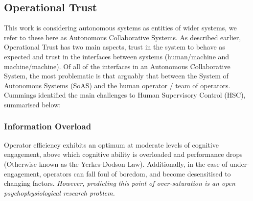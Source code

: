 
\subsection{Operational Trust}

This work is considering autonomous systems as entities of wider systems, we refer to these here as Autonomous Collaborative Systems. As described earlier, Operational Trust has two main aspects, trust in the system to behave as expected and trust in the interfaces between systems (human/machine and machine/machine). 
Of all of the interfaces in an Autonomous Collaborative System, the most problematic is that arguably that between the System of Autonomous Systems (SoAS) and the human operator / team of operators. 
Cummings identified the main challenges to Human Supervisory Control (HSC), summarised below:\cite{Cummings2010}

\subsubsection{Information Overload}
Operator efficiency exhibits an optimum at moderate levels of cognitive engagement, above which cognitive ability is overloaded and performance drops (Otherwise known as the Yerkes-Dodson Law). Additionally, in the case of under-engagement, operators can fall foul of boredom, and become desensitised to changing factors.
\textit{However, predicting this point of over-saturation is an open psychophysiological research problem.}

